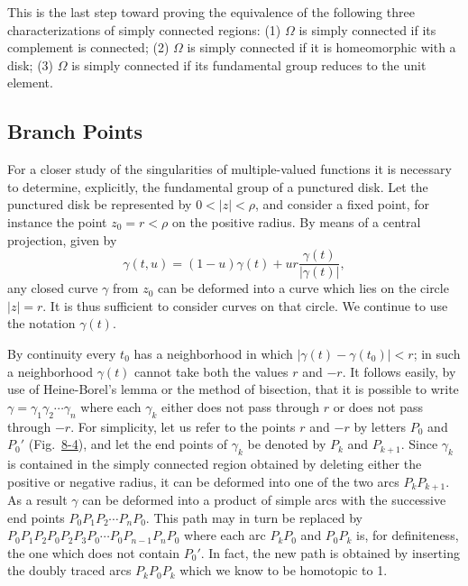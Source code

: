 This is the last step toward proving the equivalence of the following three characterizations of simply connected regions: (1) $\Omega$ is simply connected if its complement is connected; (2) $\Omega$ is simply connected if it is homeomorphic with a disk; (3) $\Omega$ is simply connected if its fundamental group reduces to the unit element.

\setcounter{section}{1}\setcounter{subsection}{6}\subsection{Branch Points}\label{sec:8.1.7}
For a closer study of the singularities of multiple-valued functions it is necessary to determine, explicitly, the fundamental group of a punctured disk. Let the punctured disk be represented by $0 < |z| < \rho$, and consider a fixed point, for instance the point $z_{0} = r < \rho$ on the positive radius. By means of a central projection, given by
\begin{equation*}
\gamma (t, u) = (1 - u) \gamma (t) + u r \frac {\gamma (t)}{| \gamma (t) |},
\end{equation*}
any closed curve $\gamma$ from $z_{0}$ can be deformed into a curve which lies on the circle $|z| = r$. It is thus sufficient to consider curves on that circle. We continue to use the notation $\gamma(t)$.

By continuity every $t_0$ has a neighborhood in which $|\gamma(t) - \gamma(t_0)| < r$; in such a neighborhood $\gamma(t)$ cannot take both the values $r$ and $-r$. It follows easily, by use of Heine-Borel's lemma or the method of bisection, that it is possible to write $\gamma = \gamma_1\gamma_2 \cdots \gamma_n$ where each $\gamma_k$ either does not pass through $r$ or does not pass through $-r$. For simplicity, let us refer to the points $r$ and $-r$ by letters $P_0$ and $P_0'$ (Fig.~\hyperref[fig:8-4]{8-4}), and let the end points of $\gamma_k$ be denoted by $P_k$ and $P_{k+1}$. Since $\gamma_k$ is contained in the simply connected region obtained by deleting either the positive or negative radius, it can be deformed into one of the two arcs $P_kP_{k+1}$. As a result $\gamma$ can be deformed into a product of simple arcs with the successive end points $P_0P_1P_2 \cdots P_nP_0$. This path may in turn be replaced by $P_0P_1P_2P_0P_2P_3P_0 \cdots P_0P_{n-1}P_nP_0$ where each arc $P_kP_0$ and $P_0P_k$ is, for definiteness, the one which does not contain $P_0'$. In fact, the new path is obtained by inserting the doubly traced arcs $P_kP_0P_k$ which we know to be homotopic to 1.

